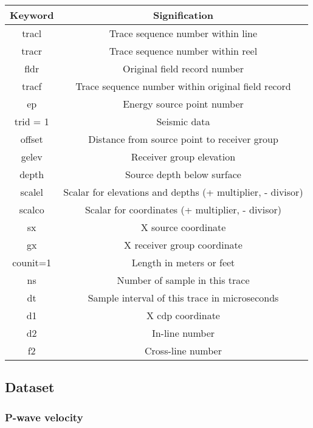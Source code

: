 \documentclass{article}
\begin{document}
\begin{center}
\begin{tabular}{|c|c|}
\hline
Keyword & Signification \\
\hline
tracl & Trace sequence number within line \\
tracr & Trace sequence number within reel \\
fldr & Original field record number \\
tracf & Trace sequence number within original field record \\
ep & Energy source point number \\
trid = 1 & Seismic data \\
offset & Distance from source point to receiver group \\
gelev & Receiver group elevation \\
depth & Source depth below surface \\
scalel & Scalar for elevations and depths (+ multiplier, - divisor) \\
scalco & Scalar for coordinates (+ multiplier, - divisor) \\
sx & X source coordinate \\
gx & X receiver group coordinate \\
counit=1 & Length in meters or feet \\
ns & Number of sample in this trace \\
dt & Sample interval of this trace in microseconds \\
d1 & X cdp coordinate \\
d2 & In-line number \\
f2 & Cross-line number \\
\hline
\end{tabular}
\end{center}

\subsection{Dataset}

\subsubsection{P-wave velocity}
\end{document}

